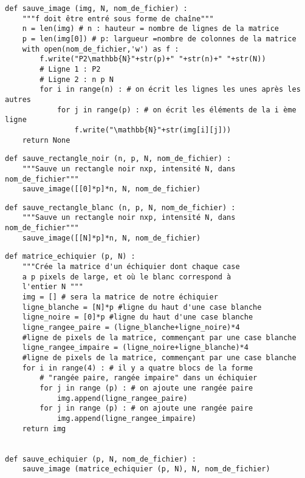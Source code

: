 \exer{}
\setcounter{numques}{0}

\question{}

\begin{lstlisting}
def sauve_image (img, N, nom_de_fichier) :
    """f doit être entré sous forme de chaîne"""
    n = len(img) # n : hauteur = nombre de lignes de la matrice 
    p = len(img[0]) # p: largueur =nombre de colonnes de la matrice
    with open(nom_de_fichier,'w') as f :
        f.write("P2\mathbb{N}"+str(p)+" "+str(n)+" "+str(N))
        # Ligne 1 : P2
        # Ligne 2 : n p N
        for i in range(n) : # on écrit les lignes les unes après les autres
            for j in range(p) : # on écrit les éléments de la i ème ligne
                f.write("\mathbb{N}"+str(img[i][j]))
    return None
\end{lstlisting}

\question{}

\begin{lstlisting}
def sauve_rectangle_noir (n, p, N, nom_de_fichier) :
    """Sauve un rectangle noir nxp, intensité N, dans nom_de_fichier"""
    sauve_image([[0]*p]*n, N, nom_de_fichier)
\end{lstlisting}

\question{}

\begin{lstlisting}
def sauve_rectangle_blanc (n, p, N, nom_de_fichier) :
    """Sauve un rectangle noir nxp, intensité N, dans nom_de_fichier"""
    sauve_image([[N]*p]*n, N, nom_de_fichier)
\end{lstlisting}

\question{}

\begin{lstlisting}
def matrice_echiquier (p, N) :
    """Crée la matrice d'un échiquier dont chaque case
    a p pixels de large, et où le blanc correspond à
    l'entier N """
    img = [] # sera la matrice de notre échiquier
    ligne_blanche = [N]*p #ligne du haut d'une case blanche
    ligne_noire = [0]*p #ligne du haut d'une case blanche
    ligne_rangee_paire = (ligne_blanche+ligne_noire)*4
    #ligne de pixels de la matrice, commençant par une case blanche
    ligne_rangee_impaire = (ligne_noire+ligne_blanche)*4
    #ligne de pixels de la matrice, commençant par une case blanche
    for i in range(4) : # il y a quatre blocs de la forme
        # "rangée paire, rangée impaire" dans un échiquier
        for j in range (p) : # on ajoute une rangée paire
            img.append(ligne_rangee_paire)
        for j in range (p) : # on ajoute une rangée paire
            img.append(ligne_rangee_impaire)
    return img


def sauve_echiquier (p, N, nom_de_fichier) :
    sauve_image (matrice_echiquier (p, N), N, nom_de_fichier)
\end{lstlisting}

